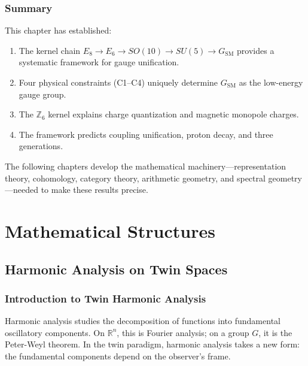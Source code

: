 \documentclass[11pt,a4paper,openright]{book}
\theoremstyle{plain}
\theoremstyle{definition}
\newcommand{\SM}{\mathrm{SM}}
\newcommand{\R}{\mathbb{R}}
\newcommand{\Z}{\mathbb{Z}}
\begin{document}
\section{Summary}

This chapter has established:

\begin{enumerate}
    \item The kernel chain $E_8 \to E_6 \to SO(10) \to SU(5) \to G_{\SM}$ provides a systematic framework for gauge unification.
    
    \item Four physical constraints (C1--C4) uniquely determine $G_{\SM}$ as the low-energy gauge group.
    
    \item The $\Z_6$ kernel explains charge quantization and magnetic monopole charges.
    
    \item The framework predicts coupling unification, proton decay, and three generations.
\end{enumerate}

The following chapters develop the mathematical machinery---representation theory, cohomology, category theory, arithmetic geometry, and spectral geometry---needed to make these results precise.



\part{Mathematical Structures}

\chapter{Harmonic Analysis on Twin Spaces}
\label{ch:harmonic}

\section{Introduction to Twin Harmonic Analysis}

Harmonic analysis studies the decomposition of functions into fundamental oscillatory components. On $\R^n$, this is Fourier analysis; on a group $G$, it is the Peter-Weyl theorem. In the twin paradigm, harmonic analysis takes a new form: the fundamental components depend on the observer's frame.
\end{document}
